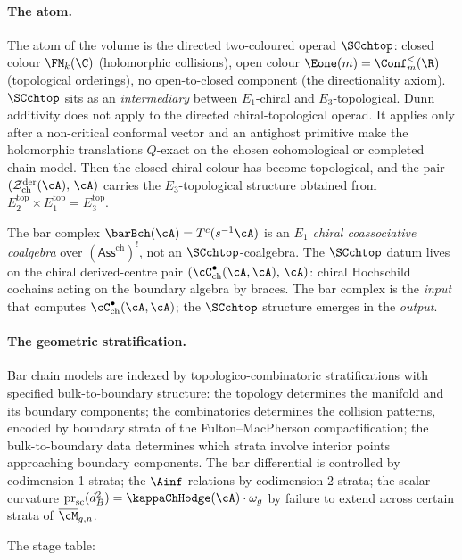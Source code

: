 \paragraph{The atom.}
The atom of the volume is the directed two-coloured operad $\SCchtop$:
closed colour $\FM_k(\C)$ (holomorphic collisions), open colour
$\Eone(m) = \Conf_m^<(\R)$ (topological orderings), no
open-to-closed component (the directionality axiom).
$\SCchtop$ sits as an \emph{intermediary} between $E_1$-chiral
and $E_3$-topological. Dunn additivity does not apply to
the directed chiral-topological operad. It applies only after a
non-critical conformal vector and an antighost primitive make the
holomorphic translations $Q$-exact on the chosen cohomological or
completed chain model. Then the closed chiral colour has become
topological, and the pair
$(\cZ^{\mathrm{der}}_{\mathrm{ch}}(\cA),\,\cA)$ carries the
$E_3$-topological structure obtained from
$E_2^{\mathrm{top}} \times E_1^{\mathrm{top}} =
E_3^{\mathrm{top}}$.

The bar complex $\barBch(\cA) = T^c(s^{-1}\bar\cA)$ is an
\emph{$E_1$ chiral coassociative coalgebra} over
$(\mathsf{Ass}^{\mathrm{ch}})^!$, not an $\SCchtop$-coalgebra.
The $\SCchtop$ datum lives on the chiral
derived-centre pair
$(\cC^\bullet_{\mathrm{ch}}(\cA,\cA),\,\cA)$: chiral Hochschild
cochains acting on the boundary algebra by braces. The bar
complex is the \emph{input} that computes
$\cC^\bullet_{\mathrm{ch}}(\cA,\cA)$; the $\SCchtop$ structure
emerges in the \emph{output}.

\paragraph{The geometric stratification.}
Bar chain models are indexed by topologico-combinatoric
stratifications with specified bulk-to-boundary structure: the
topology determines the manifold and its boundary components;
the combinatorics determines the collision patterns, encoded by
boundary strata of the Fulton--MacPherson compactification; the
	bulk-to-boundary data determines which strata involve interior
	points approaching boundary components. The bar differential is
	controlled by codimension-1 strata; the $\Ainf$ relations by
	codimension-2 strata; the scalar curvature
	$\operatorname{pr}_{\mathrm{sc}}(d_B^2) = \kappaChHodge(\cA)\cdot\omega_g$ by failure to
extend across certain strata of $\overline{\cM}_{g,n}$.

The stage table:

